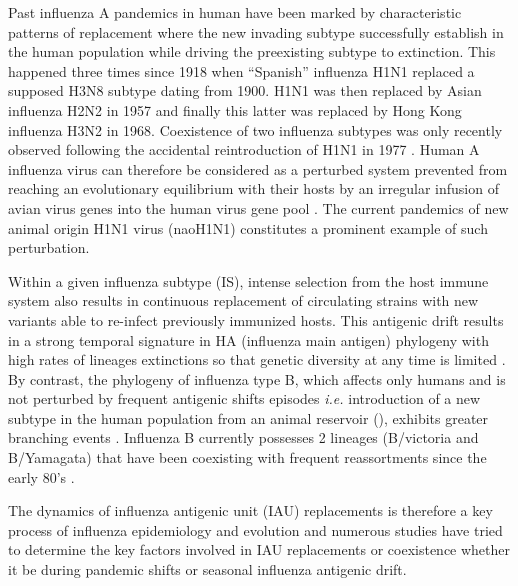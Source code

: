 Past influenza A pandemics in human have been marked by characteristic
patterns of replacement where the new invading subtype successfully
establish in the human population while driving the preexisting
subtype to extinction.
This happened three times since 1918 when ``Spanish'' influenza H1N1
replaced a supposed H3N8 subtype dating from 1900. H1N1 was then
replaced by Asian influenza H2N2 in 1957 and finally this latter was
replaced by Hong Kong influenza H3N2 in 1968. Coexistence of two
influenza subtypes was only recently observed following the accidental
reintroduction of H1N1 in 1977 \citep{Kilbourne2006, Zimmer2009}.
%
Human A influenza virus can therefore be considered as a perturbed
system prevented from reaching an evolutionary equilibrium with their
hosts by an irregular infusion of avian virus genes into the human
virus gene pool \citep{Webster1992}. The current pandemics of new
animal origin H1N1 virus (naoH1N1) constitutes a prominent example of
such perturbation.
%

%

Within a given influenza subtype (IS), intense selection from the host immune system
also results in continuous replacement of circulating strains with new
variants able to re-infect previously immunized hosts.
This antigenic drift results in a strong temporal signature in HA
(influenza main antigen) phylogeny with high rates of lineages
extinctions so that genetic diversity at any time is limited
\citep{Fitch1997}. By contrast, the phylogeny of influenza type B,
which affects only humans and is not perturbed by frequent antigenic
shifts episodes \textit{i.e.} introduction of a new subtype in the
human population from an animal reservoir (\citet{Webster1992}),
exhibits greater branching events \citep{Hay2001}. Influenza B
currently possesses 2 lineages (B/victoria and B/Yamagata) that have
been coexisting with frequent reassortments since the early 80's
\citep{Lin2004}.

The dynamics of influenza antigenic unit (IAU) replacements is
therefore a key process of influenza epidemiology and evolution and
numerous studies have tried to determine the key factors involved in
IAU replacements or coexistence whether it be during pandemic shifts
or seasonal influenza antigenic drift.


